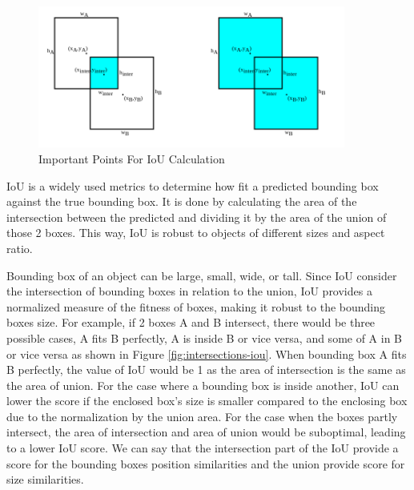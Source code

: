     \begin{figure}[p]
        \centering
        \includegraphics[width=0.9\textwidth]{figures/inter-union.png}
        \caption{Important Points For IoU Calculation}
        \label{fig:inter-union}
    \end{figure}
  

  IoU is a widely used metrics to determine how fit a predicted bounding box against the true bounding box.
  It is done by calculating the area of the intersection between the predicted and dividing it by the area of the
  union of those 2 boxes. 
  This way, IoU is robust to objects of different sizes and aspect ratio. 

  Bounding box of an object can be large, small, wide, or tall.
  Since IoU consider the intersection of bounding boxes in relation to the union,
  IoU provides a normalized measure of the fitness of boxes, making it robust 
  to the bounding boxes size. For example, if 2 boxes A and B intersect, there would be
  three possible cases, A fits B perfectly, A is inside B or vice versa, and some of A in B or vice versa as shown in Figure \ref{fig:intersections-iou}.
  When bounding box A fits B perfectly, the value of IoU would be 1 as the area of intersection is the same as the area of union.
  For the case where a bounding box is inside another, IoU can lower the score if the enclosed box's size is smaller compared to
  the enclosing box due to the normalization by the union area.
  For the case when the boxes partly intersect, the area of intersection and area of union would be suboptimal, leading to a lower IoU score. 
  We can say that the intersection part of the IoU provide a score for the bounding boxes position similarities and the 
  union provide score for size similarities.

 
  
